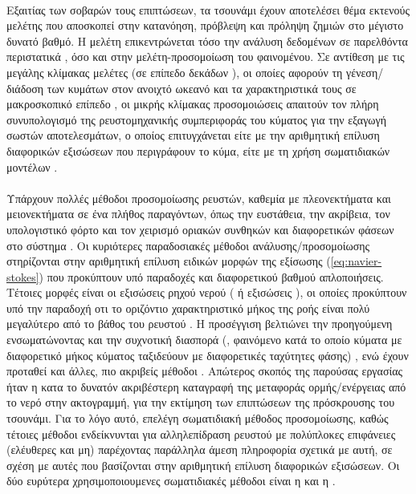 \paragraph{} Εξαιτίας των σοβαρών τους επιπτώσεων, τα τσουνάμι έχουν αποτελέσει θέμα
εκτενούς μελέτης που αποσκοπεί στην κατανόηση, πρόβλεψη και πρόληψη ζημιών στο μέγιστο
δυνατό βαθμό. Η μελέτη επικεντρώνεται τόσο την ανάλυση δεδομένων σε παρελθόντα περιστατικά
\cite{Kanamori1972346, ABE19791561}, όσο και στην μελέτη-προσομοίωση του φαινομένου. Σε
αντίθεση με τις μεγάλης κλίμακας μελέτες (σε επίπεδο δεκάδων ), οι οποίες αφορούν
τη γένεση/διάδοση των κυμάτων στον ανοιχτό ωκεανό και τα χαρακτηριστικά τους σε
μακροσκοπικό επίπεδο \cite{Shuto1991171, Titov23092005, Grilli2007414}, οι μικρής κλίμακας
προσομοιώσεις απαιτούν τον πλήρη συνυπολογισμό της ρευστομηχανικής συμπεριφοράς του
κύματος για την εξαγωγή σωστών αποτελεσμάτων, ο οποίος επιτυγχάνεται είτε με την
αριθμητική επίλυση διαφορικών εξισώσεων που περιγράφουν το κύμα, είτε με τη χρήση
σωματιδιακών μοντέλων \cite{goto1997iugg}.

\paragraph{} Υπάρχουν πολλές μέθοδοι προσομοίωσης ρευστών, καθεμία με πλεονεκτήματα και
μειονεκτήματα σε ένα πλήθος παραγόντων, όπως την ευστάθεια, την ακρίβεια, τον υπολογιστικό
φόρτο και τον χειρισμό οριακών συνθηκών και διαφορετικών φάσεων στο σύστημα
\cite{Tan2009723}. Οι κυριότερες παραδοσιακές μέθοδοι ανάλυσης/προσομοίωσης στηρίζονται
στην αριθμητική επίλυση ειδικών μορφών της εξίσωσης 
(\ref{eq:navier-stokes}) που προκύπτουν υπό παραδοχές και διαφορετικού βαθμού
απλοποιήσεις. Τέτοιες μορφές είναι οι εξισώσεις ρηχού νερού ( ή εξισώσεις ), οι οποίες προκύπτουν υπό την παραδοχή οτι το
οριζόντιο χαρακτηριστικό μήκος της ροής είναι πολύ μεγαλύτερο από το βάθος του ρευστού
\cite{audusse2004fast, brodtkorb2012efficient}. Η προσέγγιση  βελτιώνει
την προηγούμενη ενσωματώνοντας και την συχνοτική διασπορά (,
φαινόμενο κατά το οποίο κύματα με διαφορετικό μήκος κύματος ταξιδεύουν με διαφορετικές
ταχύτητες φάσης) \cite{watts2003landslide}, ενώ έχουν προταθεί και άλλες, πιο ακριβείς
μέθοδοι \cite{camassa1993integrable}. Απώτερος σκοπός της παρούσας εργασίας ήταν η κατα το
δυνατόν ακριβέστερη καταγραφή της μεταφοράς ορμής/ενέργειας από το νερό στην ακτογραμμή,
για την εκτίμηση των επιπτώσεων της πρόσκρουσης του τσουνάμι. Για το λόγο αυτό, επελέγη
σωματιδιακή μέθοδος προσομοίωσης, καθώς τέτοιες μέθοδοι εν\-δεί\-κνυ\-νται για
αλληλεπίδραση ρευστού με πολύπλοκες επιφάνειες (ελέυθερες και μη) παρέχοντας παράλληλα
άμεση πληροφορία σχετικά με αυτή, σε σχέση με αυτές που βασίζονται στην αριθμητική επίλυση
διαφορικών εξισώσεων. Οι δύο ευρύτερα χρησιμοποιουμενες σωματιδιακές μέθοδοι είναι η
 και η .

